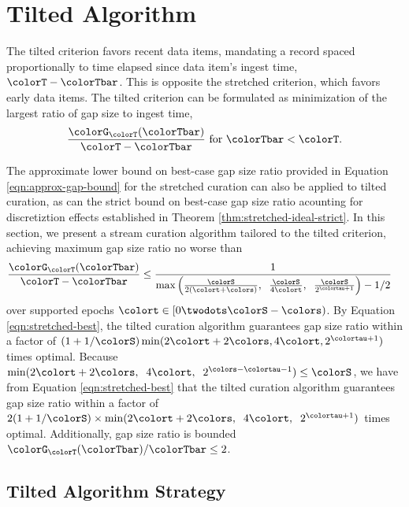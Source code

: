 \section{Tilted Algorithm} \label{sec:tilted}

The tilted criterion favors recent data items, mandating a record spaced proportionally to time elapsed since data item's ingest time, $\colorT - \colorTbar$.
This is opposite the stretched criterion, which favors early data items.
The tilted criterion can be formulated as minimization of the largest ratio of gap size to ingest time,
\begin{align*}
\frac{\colorG_{\colorT}(\colorTbar)}{\colorT - \colorTbar} \text{ for } \colorTbar < \colorT.
\end{align*}

The approximate lower bound on best-case gap size ratio provided in Equation \ref{eqn:approx-gap-bound} for the stretched curation can also be applied to tilted curation, as can the strict bound on best-case gap size ratio acounting for discretiztion effects established in Theorem \ref{thm:stretched-ideal-strict}.
In this section, we present a stream curation algorithm tailored to the tilted criterion, achieving maximum gap size ratio no worse than
\begin{align*}
  \frac{\colorG_{\colorT}(\colorTbar)}{\colorT - \colorTbar}
  &\leq
  \frac{
    1
  }{
    \max\Big(
      \frac{\colorS}{2(\colort + \colors)},\;\;
      \frac{\colorS}{4\colort},\;\;
      \frac{\colorS}{2^{\colortau + 1}}
    \Big)
    - 1/2
  }
\end{align*}
over supported epochs $\colort \in [0\twodots\colorS - \colors)$.
By Equation \ref{eqn:stretched-best}, the tilted curation algorithm guarantees gap size ratio within a factor of $(1 + 1/\colorS)\min(2\colort + 2\colors, 4\colort, 2^{\colortau + 1})$ times optimal.
Because $\min(2\colort + 2\colors,\;\; 4\colort,\;\; 2^{\colors - \colortau - 1}) \leq \colorS$, we have from Equation \ref{eqn:stretched-best} that the tilted curation algorithm guarantees gap size ratio within a factor of $2(1 + 1/\colorS)\times\min(2\colort + 2\colors, \;\; 4\colort, \;\; 2^{\colortau + 1})$ times optimal.
Additionally, gap size ratio is bounded ${\colorG_{\colorT}(\colorTbar)}/{\colorTbar} \leq 2$.


\subsection{Tilted Algorithm Strategy}
\label{sec:tilted-strategy}


